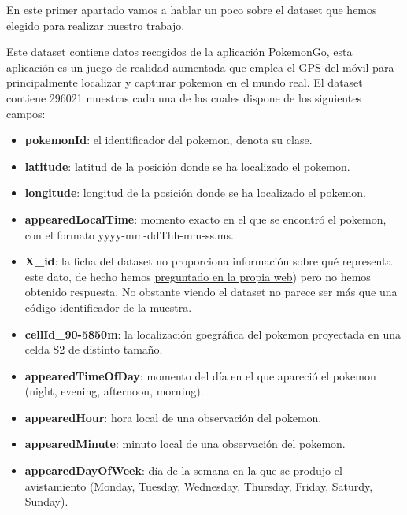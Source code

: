 En este primer apartado vamos a hablar un poco sobre el dataset que hemos elegido para realizar nuestro trabajo.

Este dataset contiene datos recogidos de la aplicación PokemonGo, esta aplicación es un juego de realidad aumentada que emplea el GPS del móvil para principalmente localizar y capturar pokemon en el mundo real. El dataset contiene 296021 muestras cada una de las cuales dispone de los siguientes campos:

\begin{itemize}

\item \textbf{pokemonId}: el identificador del pokemon, denota su clase.

\item \textbf{latitude}: latitud de la posición donde se ha localizado el pokemon.

\item \textbf{longitude}: longitud de la posición donde se ha localizado el pokemon.

\item \textbf{appearedLocalTime}: momento exacto en el que se encontró el pokemon, con el formato yyyy-mm-ddThh-mm-ss.ms.

\item \textbf{X\_id}: la ficha del dataset no proporciona información sobre qué representa este dato, de hecho hemos \href{https://www.kaggle.com/semioniy/predictemall/discussion/24061#144095}{preguntado en la propia web}) pero no hemos obtenido respuesta. No obstante viendo el dataset no parece ser más que una código identificador de la muestra. 

\item \textbf{cellId\_90-5850m}: la localización goegráfica del pokemon proyectada en una celda S2 de distinto tamaño.

\item \textbf{appearedTimeOfDay}: momento del día en el que apareció el pokemon (night, evening, afternoon, morning).

\item \textbf{appearedHour}: hora local de una observación del pokemon.

\item \textbf{appearedMinute}: minuto local de una observación del pokemon.

\item \textbf{appearedDayOfWeek}: día de la semana en la que se produjo el avistamiento (Monday, Tuesday, Wednesday, Thursday, Friday, Saturdy, Sunday).
 

\end{itemize}

